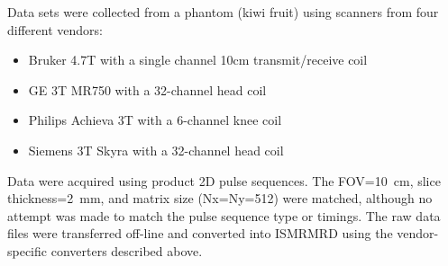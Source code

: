 \documentclass[12pt]{article}
\begin{document}
Data sets were collected from a phantom (kiwi fruit) using scanners from four different vendors: 
\begin{itemize}
\item Bruker 4.7T with a single channel 10cm transmit/receive coil
\item GE 3T MR750 with a 32-channel head coil
\item Philips Achieva 3T with a 6-channel knee coil
\item Siemens 3T Skyra with a 32-channel head coil
\end{itemize}
Data were acquired using product 2D pulse sequences.  The FOV=10~cm, slice thickness=2~mm, and matrix size (Nx=Ny=512) were matched, although no attempt was made to match the pulse sequence type or timings.  The raw data files were transferred off-line and converted into ISMRMRD using the vendor-specific converters described above.	
\end{document}
